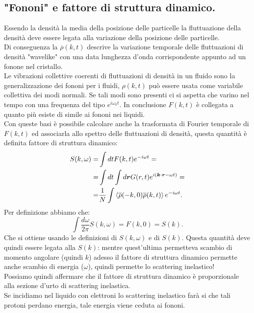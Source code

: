 \subsection{"Fononi" e fattore di struttura dinamico.}
\label{subsec:Collegamento tra la funzione di scattering intermedia ed i fononi}
Essendo la densità la media della posizione delle particelle la fluttuazione della densità deve essere legata alla variazione della posizione delle particelle.\\
Di conseguenza la $\overline{\rho }(k,t)$ descrive la variazione temporale delle fluttuazioni di densità "wavelike" con una data lunghezza d'onda corrispondente appunto ad un fonone nel cristallo.\\
Le vibrazioni collettive coerenti di fluttuazioni di densità in un fluido sono la generalizzazione dei fononi per i fluidi, $\rho (k,t)$ può essere usata come variabile collettiva dei modi normali. Se tali modi sono presenti ci si aspetta che varino nel tempo con una frequenza del tipo $e^{i\omega _kt}$. In conclusione $F(k,t)$ è collegata a quanto più esiste di simile ai fononi nei liquidi.\\
Con queste basi è possibile calcolare anche la trasformata di Fourier temporale di $F(k,t)$ ed associarla allo spettro delle fluttuazioni di densità, questa quantità è definita fattore di struttura dinamico:
\[\begin{aligned}
	S(k,\omega )
	=&
	\int dt F(k,t) e^{-i\omega t}=\\
	=&
	\int dt \int d\boldsymbol{r}G(r,t) e^{i\left( \boldsymbol{k}\cdot\boldsymbol{r}-\omega t \right)}=\\
	=&
	\frac{1}{N}\int \left<\overline{\rho }(-k,0)\overline{\rho }(k,t) \right>e^{-i\omega t}
.\end{aligned}\]
Per definizione abbiamo che:
\[
	\int\frac{d\omega }{2\pi}S(k,\omega )= F(k,0)=S(k)
.\] 
Che si ottiene usando le definizioni di $S(k,\omega )$ e di $S(k)$. Questa quantità deve quindi essere legata alla $S(k)$: mentre quest'ultima permetteva scambio di momento angolare (quindi $k$) adesso il fattore di struttura dinamico permette anche scambio di energia ($\omega $), quindi permette lo scattering inelastico!\\
Possiamo quindi affermare che il fattore di struttura dinamico è proporzionale alla sezione d'urto di scattering inelastica. \\
Se incidiamo nel liquido con elettroni lo scattering inelastico farà si che tali protoni perdano energia, tale energia viene ceduta ai fononi.

